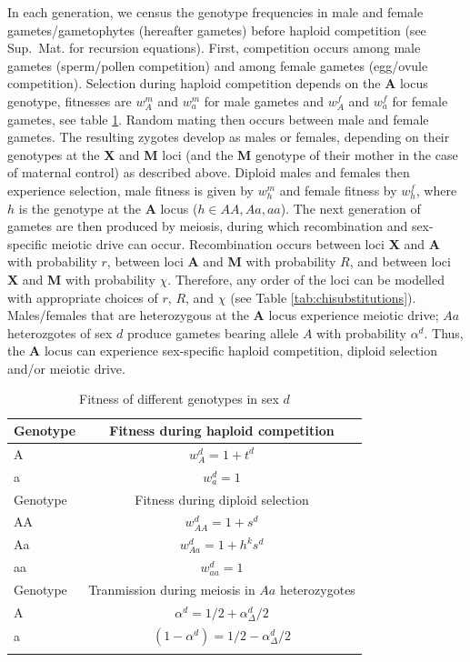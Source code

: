 \documentclass[12pt]{article}
\begin{document}
In each generation, we census the genotype frequencies in male and female gametes/gametophytes (hereafter gametes) before haploid competition (see Sup.\ Mat. for recursion equations). 
First, competition occurs among male gametes (sperm/pollen competition) and among female gametes (egg/ovule competition). 
Selection during haploid competition depends on the \textbf{A} locus genotype, fitnesses are $w_{A}^m$ and $w_{a}^m$ for male gametes and $w_{A}^f$ and $w_{a}^f$ for female gametes, see table \ref{tab:fitnesstable}. 
Random mating then occurs between male and female gametes.
The resulting zygotes develop as males or females, depending on their genotypes at the \textbf{X} and \textbf{M} loci (and the \textbf{M} genotype of their mother in the case of maternal control) as described above.
Diploid males and females then experience selection, male fitness is given by $w_{h}^{m}$ and female fitness by $w_{h}^{f}$, where $h$ is the genotype at the \textbf{A} locus ($h \in AA, Aa, aa$).  
The next generation of gametes are then produced by meiosis, during which recombination and sex-specific meiotic drive can occur. 
Recombination occurs between loci \textbf{X} and \textbf{A} with probability $r$, between loci \textbf{A} and \textbf{M} with probability $R$, and between loci \textbf{X} and \textbf{M} with probability $\chi$.
Therefore, any order of the loci can be modelled with appropriate choices of $r$, $R$, and $\chi$ (see Table \ref{tab:chisubstitutions}). 
Males/females that are heterozygous at the \textbf{A} locus experience meiotic drive; $Aa$ heterozgotes of sex $d$ produce gametes bearing allele $A$ with probability $\alpha^d$. 
Thus, the \textbf{A} locus can experience sex-specific haploid competition, diploid selection and/or meiotic drive. 

\begin{table}[ht]
\centering
\smallskip
\caption{Fitness of different genotypes in sex $d$}
\begin{tabular}{l c }
\hline\hline
  Genotype & Fitness during haploid competition \\ [0.5ex] \hline
  A & $w_{A}^d = 1+t^d$ \\
  a & $w_{a}^d = 1$ \\ [0.5ex] \hline
  Genotype & Fitness during diploid selection \\ [0.5ex] \hline
  AA & $w_{AA}^d = 1+ s^d$ \\
  Aa & $w_{Aa}^d = 1+h^k s^d$ \\
  aa & $w_{aa}^d = 1$ \\ [0.5ex] \hline
  Genotype & Tranmission during meiosis in $Aa$ heterozygotes \\ [0.5ex] \hline
  A & $\alpha^d=1/2+\alpha_{\Delta}^{d}/2$ \\
  a & $(1-\alpha^d)=1/2-\alpha_{\Delta}^{d}/2$ \\
  \hline \hline
  \label{tab:fitnesstable}
 \end{tabular}
\end{table}
\end{document}
